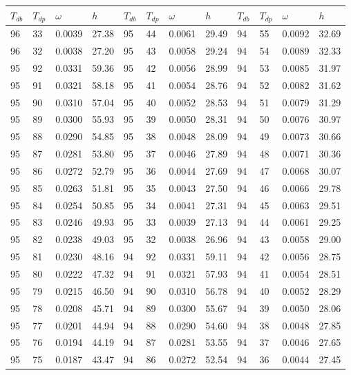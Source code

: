 \begin{tabular}{llll|llll|llll}
 \toprule 
\(T_{db}\) & \(T_{dp}\) & \(\omega\) & \(h\) & \(T_{db}\) & \(T_{dp}\) & \(\omega\) & \(h\) & \(T_{db}\) & \(T_{dp}\) & \(\omega\) & \(h\)  \\ \midrule 
96 & 33 & 0.0039 & 27.38 & 95 & 44 & 0.0061 & 29.49 & 94 & 55 & 0.0092 & 32.69\\
96 & 32 & 0.0038 & 27.20 & 95 & 43 & 0.0058 & 29.24 & 94 & 54 & 0.0089 & 32.33\\
95 & 92 & 0.0331 & 59.36 & 95 & 42 & 0.0056 & 28.99 & 94 & 53 & 0.0085 & 31.97\\
95 & 91 & 0.0321 & 58.18 & 95 & 41 & 0.0054 & 28.76 & 94 & 52 & 0.0082 & 31.62\\
95 & 90 & 0.0310 & 57.04 & 95 & 40 & 0.0052 & 28.53 & 94 & 51 & 0.0079 & 31.29\\
95 & 89 & 0.0300 & 55.93 & 95 & 39 & 0.0050 & 28.31 & 94 & 50 & 0.0076 & 30.97\\
95 & 88 & 0.0290 & 54.85 & 95 & 38 & 0.0048 & 28.09 & 94 & 49 & 0.0073 & 30.66\\
95 & 87 & 0.0281 & 53.80 & 95 & 37 & 0.0046 & 27.89 & 94 & 48 & 0.0071 & 30.36\\
95 & 86 & 0.0272 & 52.79 & 95 & 36 & 0.0044 & 27.69 & 94 & 47 & 0.0068 & 30.07\\
95 & 85 & 0.0263 & 51.81 & 95 & 35 & 0.0043 & 27.50 & 94 & 46 & 0.0066 & 29.78\\
95 & 84 & 0.0254 & 50.85 & 95 & 34 & 0.0041 & 27.31 & 94 & 45 & 0.0063 & 29.51\\
95 & 83 & 0.0246 & 49.93 & 95 & 33 & 0.0039 & 27.13 & 94 & 44 & 0.0061 & 29.25\\
95 & 82 & 0.0238 & 49.03 & 95 & 32 & 0.0038 & 26.96 & 94 & 43 & 0.0058 & 29.00\\
95 & 81 & 0.0230 & 48.16 & 94 & 92 & 0.0331 & 59.11 & 94 & 42 & 0.0056 & 28.75\\
95 & 80 & 0.0222 & 47.32 & 94 & 91 & 0.0321 & 57.93 & 94 & 41 & 0.0054 & 28.51\\
95 & 79 & 0.0215 & 46.50 & 94 & 90 & 0.0310 & 56.78 & 94 & 40 & 0.0052 & 28.29\\
95 & 78 & 0.0208 & 45.71 & 94 & 89 & 0.0300 & 55.67 & 94 & 39 & 0.0050 & 28.06\\
95 & 77 & 0.0201 & 44.94 & 94 & 88 & 0.0290 & 54.60 & 94 & 38 & 0.0048 & 27.85\\
95 & 76 & 0.0194 & 44.19 & 94 & 87 & 0.0281 & 53.55 & 94 & 37 & 0.0046 & 27.65\\
95 & 75 & 0.0187 & 43.47 & 94 & 86 & 0.0272 & 52.54 & 94 & 36 & 0.0044 & 27.45\\

\end{tabular}

